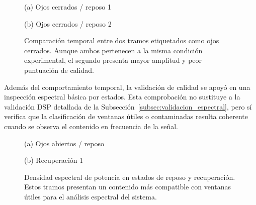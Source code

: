 \documentclass[../main.tex]{subfiles}
\begin{document}
\begin{figure}[htbp]
    \centering
    \begin{minipage}{0.49\textwidth}
        \centering
        \small (a) Ojos cerrados / reposo 1
    \end{minipage}
    \hfill
    \begin{minipage}{0.49\textwidth}
        \centering
        \small (b) Ojos cerrados / reposo 2
    \end{minipage}
    \caption{Comparación temporal entre dos tramos etiquetados como ojos cerrados. Aunque ambos pertenecen a la misma condición experimental, el segundo presenta mayor amplitud y peor puntuación de calidad.}
    \label{fig:validacion_ojos_cerrados_comparacion}
\end{figure}

Además del comportamiento temporal, la validación de calidad se apoyó en una inspección espectral básica por estados. Esta comprobación no sustituye a la validación DSP detallada de la Subsección~\ref{subsec:validacion_espectral}, pero sí verifica que la clasificación de ventanas útiles o contaminadas resulta coherente cuando se observa el contenido en frecuencia de la señal.

\begin{figure}[htbp]
    \centering
    \begin{minipage}{0.49\textwidth}
        \centering
        \small (a) Ojos abiertos / reposo
    \end{minipage}
    \hfill
    \begin{minipage}{0.49\textwidth}
        \centering
        \small (b) Recuperación 1
    \end{minipage}
    \caption{Densidad espectral de potencia en estados de reposo y recuperación. Estos tramos presentan un contenido más compatible con ventanas útiles para el análisis espectral del sistema.}
    \label{fig:validacion_estados_psd_reposo}
\end{figure}
\end{document}
